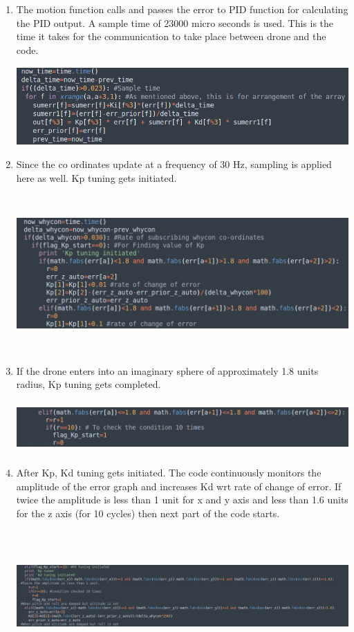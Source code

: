 \documentclass[a4paper,12pt,oneside]{book}
\begin{document}
\begin{enumerate}
\item The motion function calls and passes the error to PID function for calculating the PID output. A sample time of 23000 micro seconds is used. This is the time it takes for the communication to take place between drone and the code.


\includegraphics[width = 13cm , height= 3cm]{PID_err_8(1).png}


\item Since the co ordinates update at a frequency of 30 Hz, sampling is applied here as well. Kp tuning gets initiated.


\includegraphics[width = 13cm , height= 6cm]{PID_err_8(2).png}


\item If the drone enters into an imaginary sphere of approximately 1.8 units radius, Kp tuning gets completed.


\includegraphics[width = 13cm , height= 2cm]{PID_err_8(3).png}


\item After Kp, Kd tuning gets initiated. The code continuously monitors the amplitude of the error graph and increases Kd wrt rate of change of error. If twice the amplitude is less than 1 unit for x and y axis and less than 1.6 units for the z axis (for 10 cycles) then next part of the code starts. 


\includegraphics[width = 14cm , height= 5cm]{PID_err_8(4).png}



\end{enumerate}
\end{document}
